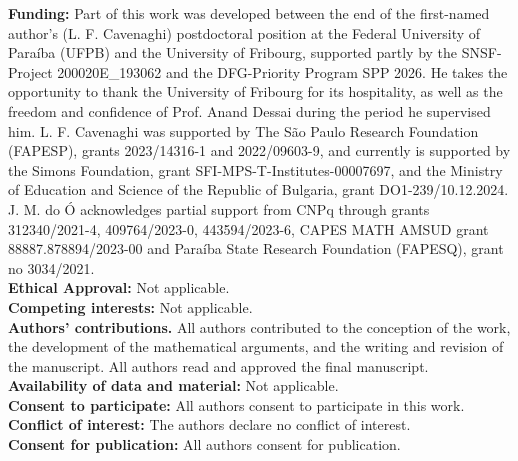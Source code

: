\documentclass[12pt,a4paper]{amsart}
\theoremstyle{plain}
\theoremstyle{definition}
\theoremstyle{remark}
\begin{document}
\begin{flushleft}
 {\bf Funding:} Part of this work was developed between the end of the first-named author's (L. F. Cavenaghi) postdoctoral position at the Federal University of Paraíba (UFPB) and the University of Fribourg, supported partly by the SNSF-Project 200020E\_193062 and the DFG-Priority Program SPP 2026. He takes the opportunity to thank the University of Fribourg for its hospitality, as well as the freedom and confidence of Prof. Anand Dessai during the period he supervised him. L. F. Cavenaghi was supported by The São Paulo Research Foundation (FAPESP), grants 2023/14316-1 and 2022/09603-9, and currently is supported by the Simons Foundation, grant SFI-MPS-T-Institutes-00007697, and the Ministry of Education and Science of the Republic of Bulgaria, grant DO1-239/10.12.2024.  J. M. do \'O acknowledges partial support from CNPq through grants 312340/2021-4, 409764/2023-0, 443594/2023-6, CAPES MATH AMSUD 
 grant 88887.878894/2023-00
and Para\'iba State Research Foundation (FAPESQ), grant no 3034/2021.     \\ 
 {\bf Ethical Approval:}  Not applicable.\\
 {\bf Competing interests:}  Not applicable. \\
 \noindent\textbf{Authors' contributions.}
All authors contributed to the conception of the work, the development of the
mathematical arguments, and the writing and revision of the manuscript. All
authors read and approved the final manuscript.\\
{\bf Availability of data and material:}  Not applicable.\\
{\bf Consent to participate:}  All authors consent to participate in this work.\\
{\bf Conflict of interest:} The authors declare no conflict of interest. \\
{\bf Consent for publication:}  All authors consent for publication. \\
\end{flushleft}





\end{document}
